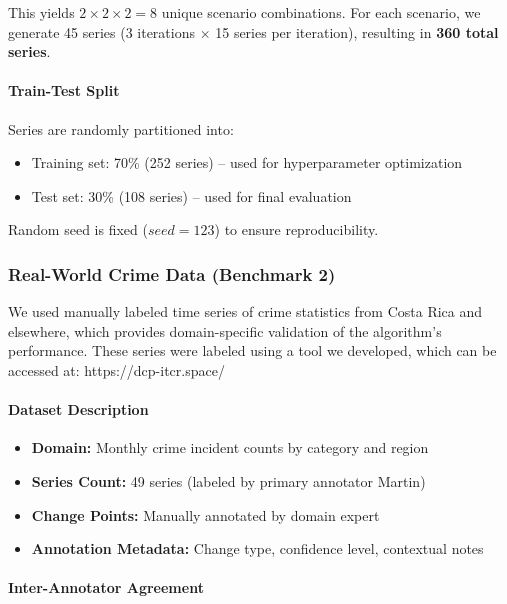 This yields $2 \times 2 \times 2 = 8$ unique scenario combinations. For each scenario, we generate 45 series (3 iterations $\times$ 15 series per iteration), resulting in \textbf{360 total series}.

\paragraph{Train-Test Split}

Series are randomly partitioned into:
\begin{itemize}
    \item Training set: 70\% (252 series) -- used for hyperparameter optimization
    \item Test set: 30\% (108 series) -- used for final evaluation
\end{itemize}

Random seed is fixed ($seed=123$) to ensure reproducibility.

\subsubsection{Real-World Crime Data (Benchmark 2)}
\label{sec:real_data}

We used manually labeled time series of crime statistics from Costa Rica and elsewhere, which provides domain-specific validation of the algorithm's performance. These series were labeled using a tool we developed, which can be accessed at: https://dcp-itcr.space/

\paragraph{Dataset Description}

\begin{itemize}
    \item \textbf{Domain:} Monthly crime incident counts by category and region
    \item \textbf{Series Count:} 49 series (labeled by primary annotator Martin)
    \item \textbf{Change Points:} Manually annotated by domain expert
    \item \textbf{Annotation Metadata:} Change type, confidence level, contextual notes
\end{itemize}

\paragraph{Inter-Annotator Agreement}

